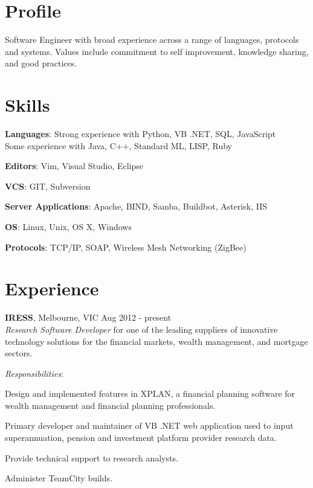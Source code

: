 \documentclass[line,margin]{res}
\begin{document}
    \address{ablack@fastmail.net}
    \address{0401 868 343}

    \begin{resume}
        \section{Profile}
        Software Engineer with broad experience across a range of languages, protocols and systems.
        Values include commitment to self improvement, knowledge sharing, and good practices.
            
        \section{Skills}
        \begin{list}{}{\leftmargin=1em \itemsep=-2pt}
            \item{\textbf{Languages}: Strong experience with Python, VB .NET, SQL, JavaScript\\
                Some experience with Java, C++, Standard ML, LISP, Ruby}
            \item{\textbf{Editors}: Vim, Visual Studio, Eclipse}
            \item{\textbf{VCS}: GIT, Subversion}
            \item{\textbf{Server Applications}: Apache, BIND, Samba, Buildbot, Asterisk, IIS}
            \item{\textbf{OS}: Linux, Unix, OS X, Windows}
            \item{\textbf{Protocols}: TCP/IP, SOAP, Wireless Mesh Networking (ZigBee)}
        \end{list}

        \section{Experience}
        \textbf{IRESS}, Melbourne, VIC \hfill Aug 2012 - present \\
        \textit{Research Software Developer} for one of the leading suppliers of innovative technology
        solutions for the financial markets, wealth management, and mortgage sectors.

        \textit{Responsibilities}:
        \begin{list}{}{\leftmargin=1em \itemsep=-2pt}
            \item{Design and implemented features in XPLAN, a financial planning software for wealth
            management and financial planning professionals.}
            \item{Primary developer and maintainer of VB .NET web application used to input superannuation,
            pension and investment platform provider research data.}
            \item{Provide technical support to research analysts.}
            \item{Administer TeamCity builds.}
        \end{list}


\end{resume}
\end{document}
